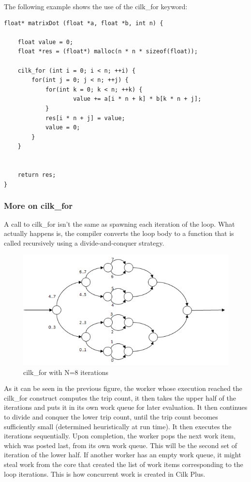 \documentclass[a4paper,10pt,openright,openbib,twocolumn]{article}
\begin{document}
The following example shows the use of the cilk\_for keyword:

\begin{minipage}{.45\textwidth}
\begin{lstlisting}[caption=Matrix multiplication using Cilk Plus]
float* matrixDot (float *a, float *b, int n) {
    
    float value = 0;
    float *res = (float*) malloc(n * n * sizeof(float));

    cilk_for (int i = 0; i < n; ++i) {
        for(int j = 0; j < n; ++j) {            
            for(int k = 0; k < n; ++k) {
                    value += a[i * n + k] * b[k * n + j];
            }
            res[i * n + j] = value;
            value = 0;
        }
    }
    
    
    return res;
}
\end{lstlisting}    
\end{minipage}

\subsubsection{More on cilk\_for}
A call to cilk\_for isn't the same as spawning each iteration of the loop. What actually happens is, the compiler converts the loop body to a function that is called recursively using a divide-and-conquer strategy. \\
    \begin{figure}[!htb]
            \centering
            \includegraphics[scale=0.9]{../pres/images/cilkfor.jpg}
            \caption{cilk\_for with N=8 iterations}
            \label{roofline}
        \end{figure}
        
As it can be seen in the previous figure, the worker whose execution reached the cilk\_for construct computes the trip count, it then takes the upper half of the iterations and puts it in its own work queue for later evaluation. It then continues to divide and conquer the lower trip count, until the trip count becomes sufficiently small (determined heuristically at run time). It then executes the iterations sequentially. Upon completion, the worker pops the next work item, which was posted last, from its own work queue. This will be the second set of iteration of the lower half. If another worker has an empty work queue, it might steal work from the core that created the list of work items corresponding to the loop iterations. This is how concurrent work is created in Cilk Plus.
\end{document}
